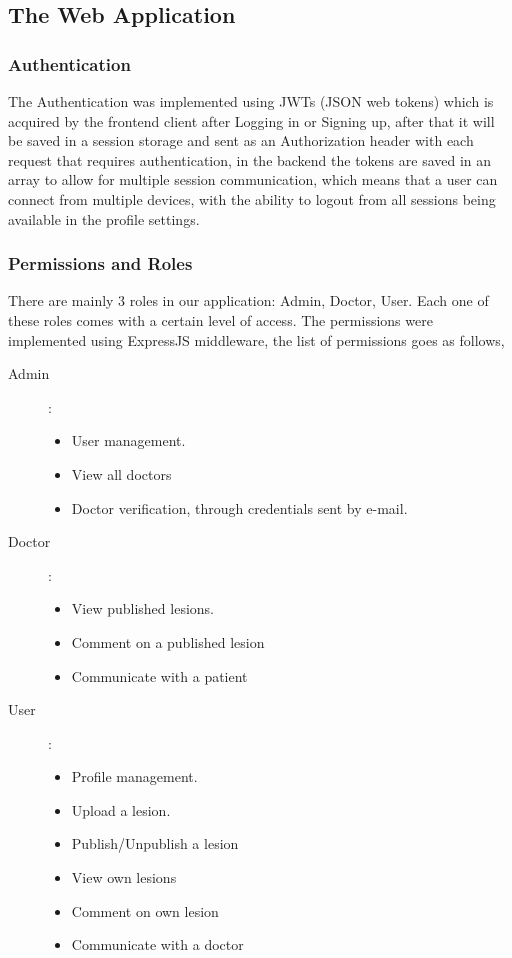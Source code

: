 \subsection{The Web Application}
    \subsubsection{Authentication}
        The Authentication was implemented using JWTs (JSON web tokens) which is acquired by the frontend client after Logging in or Signing up, after that it will be saved in a session storage and sent as an Authorization header with each request that requires authentication, in the backend the tokens are saved in an array to allow for multiple session communication, which means that a user can connect from multiple devices, with the ability to logout from all sessions being available in the profile settings.
    
    \subsubsection{Permissions and Roles}
        There are mainly 3 roles in our application: Admin, Doctor, User. Each one of these roles comes with a certain level of access. The permissions were implemented using ExpressJS middleware, the list of permissions goes as follows, 

        \begin{description}
            \item[Admin]:\\
            \begin{itemize}
                \item User management.
                \item View all doctors
                \item Doctor verification, through credentials sent by e-mail.
            \end{itemize}
            \item[Doctor]:\\
            \begin{itemize}
                \item View published lesions.
                \item Comment on a published lesion
                \item Communicate with a patient
            \end{itemize}
            \item[User]:\\
            \begin{itemize}
                \item Profile management.
                \item Upload a lesion.
                \item Publish/Unpublish a lesion
                \item View own lesions
                \item Comment  on own lesion
                \item Communicate with a doctor 
            \end{itemize}
        \end{description}
    
